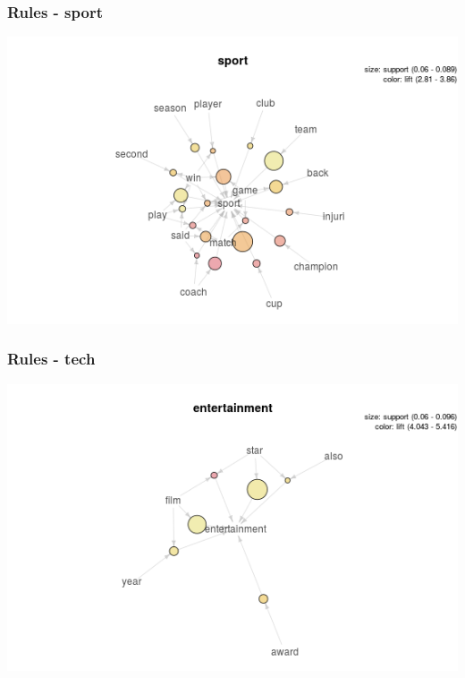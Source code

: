 \documentclass{beamer}
\begin{document}
	\begin{frame}
			\frametitle{Rules - sport}
			\begin{center}
				\includegraphics[scale=0.55]{sport.png}
			\end{center}
	\end{frame}
	
	
	\begin{frame}
			\frametitle{Rules - tech}
			\begin{center}
				\includegraphics[scale=0.55]{entertainment.png}
			\end{center}
	\end{frame}
	
\end{document}
